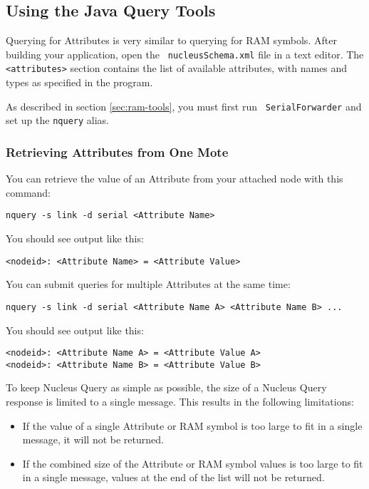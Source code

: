 \documentclass{article}
\begin{document}
\subsection{Using the Java Query Tools}

Querying for Attributes is very similar to querying for RAM
symbols. After building your application, open the {\tt
nucleusSchema.xml} file in a text editor. The {\tt<attributes>}
section contains the list of available attributes, with names and
types as specified in the program. 

As described in section \ref{sec:ram-tools}, you must first run {\tt
SerialForwarder} and set up the {\tt nquery} alias.

\subsubsection{Retrieving Attributes from One Mote}

You can retrieve the value of an Attribute from your attached node
with this command:

\begin{verbatim}
nquery -s link -d serial <Attribute Name>
\end{verbatim}

You should see output like this:

\begin{verbatim}
<nodeid>: <Attribute Name> = <Attribute Value>
\end{verbatim}

You can submit queries for multiple Attributes at the same time:

\begin{verbatim}
nquery -s link -d serial <Attribute Name A> <Attribute Name B> ...
\end{verbatim}

You should see output like this:

\begin{verbatim}
<nodeid>: <Attribute Name A> = <Attribute Value A>
<nodeid>: <Attribute Name B> = <Attribute Value B>
\end{verbatim}
 
To keep Nucleus Query as simple as possible, the size of a Nucleus
Query response is limited to a single message. This results in the
following limitations:

\begin{itemize}
\item If the value of a single Attribute or RAM symbol is too large to
fit in a single message, it will not be returned.
\item If the combined size of the Attribute or RAM symbol values is
too large to fit in a single message, values at the end of the list
will not be returned.
\end{itemize}
\end{document}
